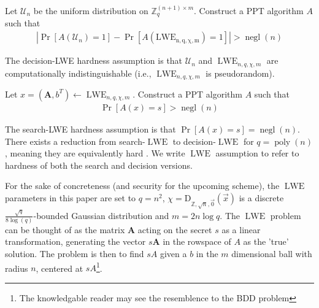 \begin{definition}
    Let $\mathcal{U}_n$ be the uniform distribution on $\mathbb{Z}_q^{(n+1) \times m}$. Construct a PPT algorithm $A$ such that 
    \begin{equation*}
        \begin{aligned}
        |\operatorname{Pr}[A(\mathcal{U}_n) = 1] - \operatorname{Pr}[A(\operatorname{LWE_{n,q,\chi,m}}) = 1]| > \operatorname{negl}(n)
        \end{aligned}
    \end{equation*}
\end{definition}
The decision-LWE hardness assumption is that $\mathcal{U}_n$ and $\operatorname{LWE}_{n,q,\chi,m}$ are computationally indistinguishable (i.e., $\operatorname{LWE}_{n,q,\chi,m}$ is pseudorandom).
\begin{definition}
    Let $x = (\textbf{A}, b^T) \leftarrow \operatorname{LWE}_{n,q,\chi,m}$. Construct a PPT algorithm $A$ such that 
    \begin{equation*}
        \begin{aligned}
            \operatorname{Pr}[A(x) = s] > \operatorname{negl}(n)
        \end{aligned}
    \end{equation*}
\end{definition}
The search-LWE hardness assumption is that $\operatorname{Pr}[A(x) = s] = \operatorname{negl}(n)$.
There exists a reduction from search-$\operatorname{LWE}$ to decision-$\operatorname{LWE}$ for $q = \operatorname{poly}(n)$, meaning they are equivalently hard \cite{LWE-hardness}. We write $\operatorname{LWE}$ assumption to refer to hardness of both the search and decision versions.

For the sake of concreteness (and security for the upcoming scheme), the $\operatorname{LWE}$ parameters in this paper are set to $q = n^2$, $\chi = \textrm{D}_{\mathbb{Z}, \sqrt{n}, \vec{0}}(\vec{x})$ is a discrete $\frac{\sqrt{q}}{8\log(q)}$-bounded Gaussian distribution and $m = 2n \log q$. The $\operatorname{LWE}$ problem can be thought of as the matrix $\textbf{A}$ acting on the secret $s$ as a linear transformation, generating the vector $s\textbf{A}$ in the rowspace of $A$ as the 'true' solution. The problem is then to find $sA$ given a $b$ in the $m$ dimensional ball with radius $n$, centered at $sA$\footnote{The knowledgable reader may see the resemblence to the BDD problem}.

